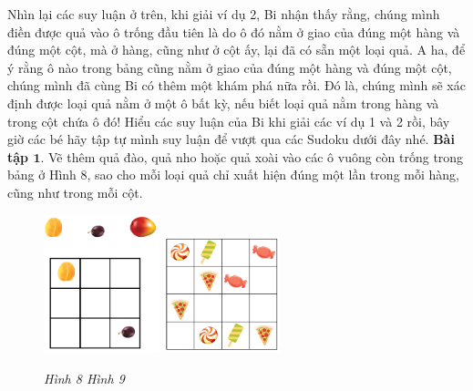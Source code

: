 	\vskip 0.1cm
	Nhìn lại các suy luận ở trên, khi giải ví dụ 2, Bi nhận thấy rằng, chúng mình điền được quả vào ô trống đầu tiên là do ô đó nằm ở giao của đúng một hàng và đúng một cột, mà ở hàng, cũng như ở cột ấy, lại đã có sẵn một loại quả. A ha, để ý rằng ô nào trong bảng cũng nằm ở giao của đúng một hàng và đúng một cột, chúng mình đã cùng Bi có thêm một khám phá nữa rồi. Đó là, chúng mình sẽ xác định được loại quả nằm ở một ô bất kỳ, nếu biết loại quả nằm trong hàng và trong cột chứa ô đó!
	\vskip 0.1cm
	Hiểu các suy luận của Bi khi giải các ví dụ 1 và 2 rồi, bây giờ các bé hãy tập tự mình suy luận để vượt qua các Sudoku dưới đây nhé.
	\vskip 0.1cm
	\textbf{Bài tập $\pmb{1.}$} Vẽ thêm quả đào, quả nho hoặc quả xoài vào các ô vuông còn trống trong bảng ở Hình 8, sao cho mỗi loại quả chỉ xuất hiện đúng một lần trong mỗi hàng, cũng như trong mỗi cột.
	\vskip 0.3cm
	\begin{figure}[H]
		\vspace*{-5pt}
		\centering
		\captionsetup{labelformat=empty, justification=centering}
		\includegraphics[width=0.30\textwidth]{hinh8}\hspace{40pt}
		\includegraphics[width=0.30\textwidth]{hinh10}

		\caption{\textit{\small Hình 8 \hspace*{100pt} Hình 9}} %
		\vspace*{-10pt}
	\end{figure}
	

